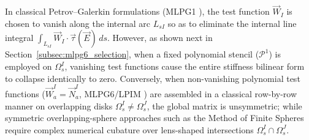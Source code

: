 \documentclass[preprint,12pt]{elsarticle}
\begin{document}
In classical Petrov--Galerkin formulations (MLPG1 \cite{atluri1998new, atluri2002meshless}), the test function $\vec{W}_I$ is chosen to vanish along the internal arc $L_{sI}$ so as to eliminate the internal line integral $\int_{L_{sI}} \vec{W}_I \cdot \vec{\tau}(\vec{E}) \, ds$. However, as shown next in Section~\ref{subsec:mlpg6_selection}, when a fixed polynomial stencil ($\mathcal{P}^1$) is employed on $\Omega_s^I$, vanishing test functions cause the entire stiffness bilinear form to collapse identically to zero. Conversely, when non-vanishing polynomial test functions ($\vec{W}_a^I = \vec{N}_a^I$, MLPG6/LPIM \cite{liu2001local, liu2005introduction, nicomedes2012meshless}) are assembled in a classical row-by-row manner on overlapping disks $\Omega_s^I \ne \Omega_s^J$, the global matrix is unsymmetric; while symmetric overlapping-sphere approaches such as the Method of Finite Spheres \cite{de2000method, nicomedes2021acoustic} require complex numerical cubature over lens-shaped intersections $\Omega_s^I \cap \Omega_s^J$.
\end{document}
